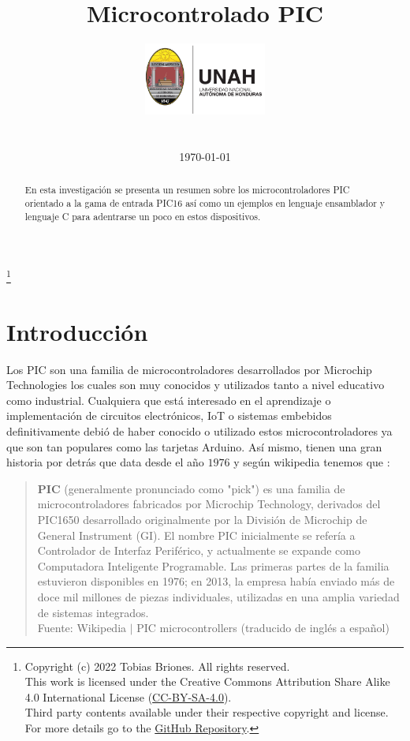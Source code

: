 \documentclass[conference]{IEEEtran}
\title{Microcontrolado PIC}
\author{
    \includegraphics[width = 40mm]{images/logo-unah.png}\\[8ex]
    \IEEEauthorblockN{Tobias Briones}
    \IEEEauthorblockN{tobias.briones@unah.hn}
    \IEEEauthorblockA{\textit{Universidad Nacional Autónoma de Honduras} \\
    \textit{Ingeniería de Sistemas} \\
    \textit{I PAC 2022} \\
    \textit{IS911-MICROPROCESADORES}} \\\vspace*{20pt} \normalsize  \\
    \today
}
\newcommand\blfootnote[1]{%
    \begingroup
    \renewcommand\thefootnote{}\footnote{#1}%
    \addtocounter{footnote}{-1}%
    \endgroup
}
\begin{document}
    \maketitle

    \begin{abstract}
        En esta investigación se presenta un resumen sobre los microcontroladores PIC orientado a la gama de entrada PIC16 así como un ejemplos en lenguaje ensamblador y lenguaje C para adentrarse un poco en estos dispositivos.
    \end{abstract}

    \tableofcontents

    \blfootnote{
        Copyright (c) 2022 Tobias Briones. All rights reserved. \\
        This work is licensed under the Creative Commons Attribution Share Alike 4.0 International License (\href{https://spdx.org/licenses/CC-BY-SA-4.0}{CC-BY-SA-4.0}). \\
        Third party contents available under their respective copyright and license.\\
        For more details go to the \href{https://github.com/tobiasbriones/cp-unah-is911-microprocessors}{GitHub Repository}.}

    \section{Introducción}

    Los PIC son una familia de microcontroladores desarrollados por Microchip Technologies \cite{microchip-technology-inc-2013} los cuales son muy conocidos y utilizados tanto a nivel educativo como industrial. Cualquiera que está interesado en el aprendizaje o implementación de circuitos electrónicos, IoT o sistemas embebidos definitivamente debió de haber conocido o utilizado estos microcontroladores ya que son tan populares como las tarjetas Arduino. Así mismo, tienen una gran historia por detrás que data desde el año $1976$ y según wikipedia tenemos que \cite{wikipedia-pic-2022}:

    \bigbreak

    \begin{quote}
        \textbf{PIC} (generalmente pronunciado como "pick") es una familia de microcontroladores fabricados por Microchip Technology, derivados del PIC1650 desarrollado originalmente por la División de Microchip de General Instrument (GI). El nombre PIC inicialmente se refería a Controlador de Interfaz Periférico, y actualmente se expande como Computadora Inteligente Programable. Las primeras partes de la familia estuvieron disponibles en 1976; en 2013, la empresa había enviado más de doce mil millones de piezas individuales, utilizadas en una amplia variedad de sistemas integrados.
        \\
        \small Fuente: Wikipedia $\mid$ PIC microcontrollers (traducido de inglés a español) \cite{wikipedia-pic-2022}
    \end{quote}
\end{document}
